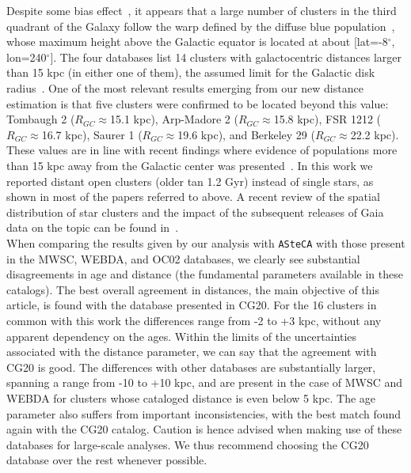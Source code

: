 \documentclass{aa}
\begin{document}
  Despite some bias effect~\citep[e.g., lower dust absorption, particularly
  along the Fitzgerald window;][]{Fitzgerald_1968}, it appears that a large
  number of clusters in the third quadrant of the Galaxy follow the warp defined
  by the diffuse blue population~\citep{Carraro_2005_detection,Moitinho_2006},
  whose maximum height above the Galactic equator is located at about
  [lat=-8$^{\circ}$, lon=240$^{\circ}$].
  The four databases list 14 clusters with galactocentric distances larger
  than 15 kpc (in either one of them), the assumed limit for the Galactic disk
  radius~\citep[see][and references therein]{Carraro_2010}.
  One of the most relevant results emerging from our new distance estimation is
  that five clusters were confirmed to be located beyond this value: Tombaugh 2 ($R_{GC}\approx$15.1 kpc), Arp-Madore 2
  ($R_{GC}\approx$15.8 kpc), FSR 1212 ($R_{GC}\approx$16.7 kpc), Saurer 1
  ($R_{GC}\approx$19.6 kpc), and Berkeley 29 ($R_{GC}\approx$22.2 kpc). These
  values are in line with recent findings where evidence of populations more than
  15 kpc away from the Galactic center was presented~\citep[][and references
  therein]{Liu_2017,Lopez_2018}.
  In this work we   reported distant open clusters (older tan 1.2 Gyr)
  instead of single stars, as shown in most of the papers referred to above.
  A recent review of the spatial distribution of star clusters and
  the impact of the subsequent releases of Gaia data on the topic can be found
  in~\cite{Cantat-Gaudin_2022}.\\

  When comparing the results given by our analysis with \texttt{ASteCA} with
  those present in the MWSC, WEBDA, and OC02 databases, we clearly
  see substantial disagreements in age and distance (the fundamental
  parameters available in these catalogs).
  The best overall agreement in distances, the main objective of this article,
  is found with the database presented in CG20. For the 16 clusters in
  common with this work the differences range from -2 to +3 kpc, without any
  apparent dependency on the ages. Within the limits of the uncertainties
  associated with the distance parameter, we can say that the agreement with
  CG20 is good.
  The differences with other databases are substantially larger, spanning a
  range from -10 to +10 kpc, and are present in the case of MWSC and WEBDA for
  clusters whose cataloged distance is even below 5 kpc.
  The age parameter also suffers  from important inconsistencies, with
  the best match found again with the CG20 catalog.
  Caution is hence advised when making use of these databases for large-scale
  analyses. We thus recommend choosing the CG20 database over the rest whenever
  possible.
\end{document}
